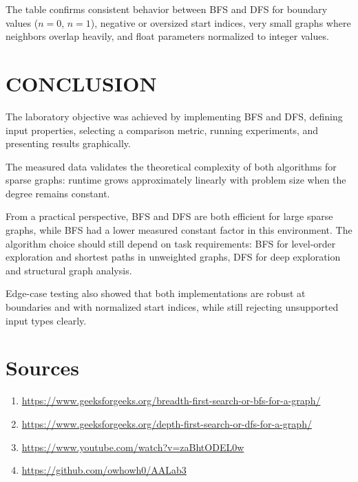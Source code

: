 \documentclass{labreport}
\begin{document}
The table confirms consistent behavior between BFS and DFS for boundary values ($n=0$, $n=1$), negative or oversized start indices, very small graphs where neighbors overlap heavily, and float parameters normalized to integer values.

\newpage
\section{CONCLUSION}

The laboratory objective was achieved by implementing BFS and DFS, defining input properties, selecting a comparison metric, running experiments, and presenting results graphically.

The measured data validates the theoretical complexity of both algorithms for sparse graphs: runtime grows approximately linearly with problem size when the degree remains constant.

From a practical perspective, BFS and DFS are both efficient for large sparse graphs, while BFS had a lower measured constant factor in this environment. The algorithm choice should still depend on task requirements: BFS for level-order exploration and shortest paths in unweighted graphs, DFS for deep exploration and structural graph analysis.

Edge-case testing also showed that both implementations are robust at boundaries and with normalized start indices, while still rejecting unsupported input types clearly.

\section*{Sources}
\begin{enumerate}
    \item \url{https://www.geeksforgeeks.org/breadth-first-search-or-bfs-for-a-graph/}
    \item \url{https://www.geeksforgeeks.org/depth-first-search-or-dfs-for-a-graph/}
    \item \url{https://www.youtube.com/watch?v=zaBhtODEL0w}
    \item \url{https://github.com/owhowh0/AALab3}
\end{enumerate}
\end{document}
